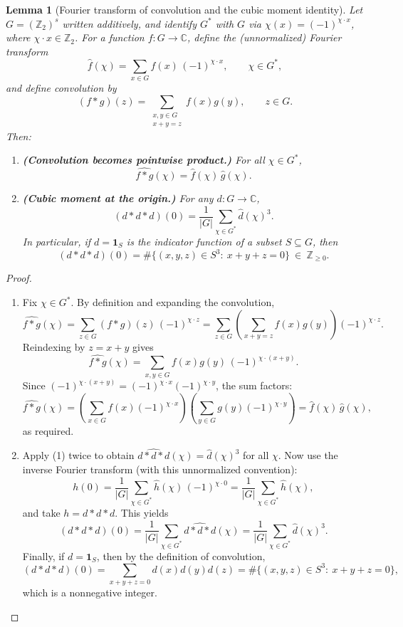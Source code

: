 \documentclass[12pt,twoside,]{amsart}
\theoremstyle{plain}
\newtheorem{lemma}[theorem]{Lemma}
\theoremstyle{definition}
\begin{document}
\begin{lemma}[Fourier transform of convolution and the cubic moment identity]\label{lem:fourier-convolution-cubic}
Let $G=(\mathbb Z_2)^s$ written additively, and identify $G^*$ with $G$ via
$\chi(x)=(-1)^{\chi\cdot x}$, where $\chi\cdot x\in\mathbb Z_2$.
For a function $f:G\to\mathbb C$, define the (unnormalized) Fourier transform
\[
\widehat f(\chi)=\sum_{x\in G} f(x)\,(-1)^{\chi\cdot x},\qquad \chi\in G^*,
\]
and define convolution by
\[
(f*g)(z)=\sum_{\substack{x,y\in G\\ x+y=z}} f(x)g(y),\qquad z\in G.
\]
Then:
\begin{enumerate}
\item \textbf{(Convolution becomes pointwise product.)} For all $\chi\in G^*$,
\[
\widehat{f*g}(\chi)=\widehat f(\chi)\,\widehat g(\chi).
\]
\item \textbf{(Cubic moment at the origin.)} For any $d:G\to\mathbb C$,
\[
(d*d*d)(0)=\frac{1}{|G|}\sum_{\chi\in G^*}\widehat d(\chi)^3.
\]
In particular, if $d=\mathbf{1}_S$ is the indicator function of a subset $S\subseteq G$,
then
\[
(d*d*d)(0)=\#\{(x,y,z)\in S^3:\ x+y+z=0\}\ \in\ \mathbb Z_{\ge 0}.
\]
\end{enumerate}
\end{lemma}

\begin{proof}
\begin{enumerate}
\item Fix $\chi\in G^*$. By definition and expanding the convolution,
\[
\widehat{f*g}(\chi)
=\sum_{z\in G} (f*g)(z)\,(-1)^{\chi\cdot z}
=\sum_{z\in G}\left(\sum_{x+y=z} f(x)g(y)\right)(-1)^{\chi\cdot z}.
\]
Reindexing by $z=x+y$ gives
\[
\widehat{f*g}(\chi)=\sum_{x,y\in G} f(x)g(y)\,(-1)^{\chi\cdot(x+y)}.
\]
Since $(-1)^{\chi\cdot(x+y)}=(-1)^{\chi\cdot x}(-1)^{\chi\cdot y}$, the sum factors:
\[
\widehat{f*g}(\chi)
=\left(\sum_{x\in G} f(x)(-1)^{\chi\cdot x}\right)
 \left(\sum_{y\in G} g(y)(-1)^{\chi\cdot y}\right)
=\widehat f(\chi)\,\widehat g(\chi),
\]
as required.

\item Apply (1) twice to obtain $\widehat{d*d*d}(\chi)=\widehat d(\chi)^3$ for all $\chi$.
Now use the inverse Fourier transform (with this unnormalized convention):
\[
h(0)=\frac{1}{|G|}\sum_{\chi\in G^*}\widehat h(\chi)\,(-1)^{\chi\cdot 0}
=\frac{1}{|G|}\sum_{\chi\in G^*}\widehat h(\chi),
\]
and take $h=d*d*d$. This yields
\[
(d*d*d)(0)=\frac{1}{|G|}\sum_{\chi\in G^*}\widehat{d*d*d}(\chi)
=\frac{1}{|G|}\sum_{\chi\in G^*}\widehat d(\chi)^3.
\]
Finally, if $d=\mathbf{1}_S$, then by the definition of convolution,
\[
(d*d*d)(0)=\sum_{x+y+z=0} d(x)d(y)d(z)
=\#\{(x,y,z)\in S^3:\ x+y+z=0\},
\]
which is a nonnegative integer.
\end{enumerate}
\end{proof}
\end{document}
